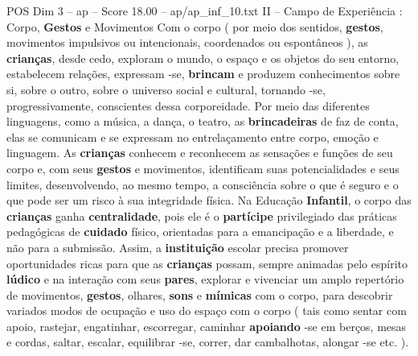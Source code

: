 \begin{textsample}{POS Dim 3 – ap – Score 18.00 – ap/ap\_inf\_10.txt}  \label{ex:f3_pos_187}
II – Campo de Experiência : Corpo, \textbf{Gestos} e Movimentos Com o corpo ( por meio dos sentidos, \textbf{gestos}, movimentos impulsivos ou intencionais, coordenados ou espontâneos ), as \textbf{crianças}, desde cedo, exploram o mundo, o espaço e os objetos do seu entorno, estabelecem relações, expressam -se, \textbf{brincam} e produzem conhecimentos sobre si, sobre o outro, sobre o universo social e cultural, tornando -se, progressivamente, conscientes dessa corporeidade.
Por meio das diferentes linguagens, como a música, a dança, o teatro, as \textbf{brincadeiras} de faz de conta, elas se comunicam e se expressam no entrelaçamento entre corpo, emoção e linguagem.
As \textbf{crianças} conhecem e reconhecem as sensações e funções de seu corpo e, com seus \textbf{gestos} e movimentos, identificam suas potencialidades e seus limites, desenvolvendo, ao mesmo tempo, a consciência sobre o que é seguro e o que pode ser um risco à sua integridade física.
Na Educação \textbf{Infantil}, o corpo das \textbf{crianças} ganha \textbf{centralidade}, pois ele é o \textbf{partícipe} privilegiado das práticas pedagógicas de \textbf{cuidado} físico, orientadas para a emancipação e a liberdade, e não para a submissão.
Assim, a \textbf{instituição} escolar precisa promover oportunidades ricas para que as \textbf{crianças} possam, sempre animadas pelo espírito \textbf{lúdico} e na interação com seus \textbf{pares}, explorar e vivenciar um amplo repertório de movimentos, \textbf{gestos}, olhares, \textbf{sons} e \textbf{mímicas} com o corpo, para descobrir variados modos de ocupação e uso do espaço com o corpo ( tais como sentar com apoio, rastejar, engatinhar, escorregar, caminhar \textbf{apoiando} -se em berços, mesas e cordas, saltar, escalar, equilibrar -se, correr, dar cambalhotas, alongar -se etc. ).

\end{textsample}
